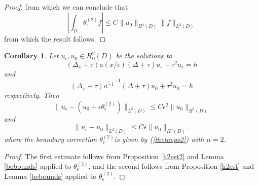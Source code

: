 \documentclass[12pt]{article}
\newtheorem{corollary}{Corollary}
\begin{document}
\begin{proof}
from which we can conclude that 
$$ \left| \int_ D \theta_\epsilon^{(2)} f \right| \leq C\| u_0\|_{H^4(D)}  \| f \|_{L^2(D)}$$
from which the result follows. 
 \end{proof}
\begin{corollary} \label{l2estexpansion} Let $u_\epsilon, u_0 \in H^2_0( D)$  be the solutions to 
\begin{equation} \label{fourthordeqest2}  (\Delta_x +\tau) a(x/\epsilon) (\Delta +\tau) u_\epsilon +\tau^2 u_\epsilon= h \end{equation}
and
\begin{equation} \label{homogeqest2}  (\Delta_x +\tau) \overline{a^{-1}}^{-1} (\Delta +\tau) u_0 +\tau^2 u_0= h \end{equation}
respectively. Then 
$$ \| u_\epsilon -(u_0 + \epsilon\theta_\epsilon^{(2)} ) \|_{L^2( D)} \leq C\epsilon^2 \| u_0 \|_{H^5( D)} $$
and 
$$ \| u_\epsilon - u_0 \|_{L^2( D)} \leq C\epsilon \| u_0 \|_{H^4( D)} .$$
where the boundary correction $\theta_\epsilon^{(2)}$is given by (\ref{thetaeps2}) with $n=2$. 
\end{corollary} 
\begin{proof} The first estimate follows from Proposition \ref{h2est2} and Lemma \ref{bcbounds} applied to $\theta_\epsilon^{(3)}$, and the second follows from Proposition \ref{h2est} and Lemma \ref{bcbounds} applied to $\theta_\epsilon^{(2)}$.
\end{proof}
\end{document}
